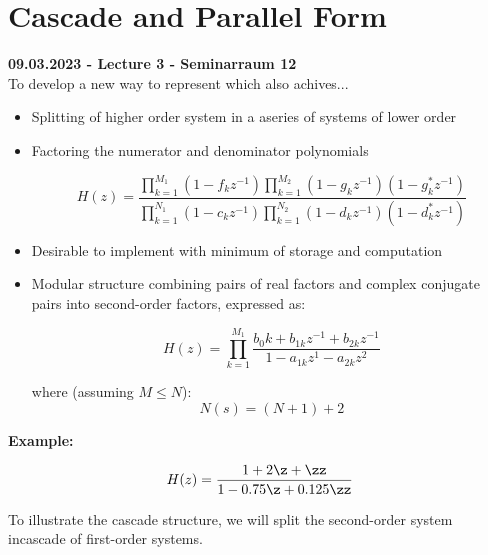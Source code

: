 \section{Cascade and Parallel Form}
\textbf{09.03.2023 - Lecture 3 - Seminarraum 12}\\

To develop a new way to represent which also achives...

\begin{itemize}
	\item Splitting of higher order system in a aseries of systems of lower order
	\item Factoring the numerator and denominator polynomials

	$$
	H(z) =
	\frac{\displaystyle \prod_{k=1}^{M_1}(1-f_kz^{-1}) \prod_{k=1}^{M_2}(1-g_kz^{-1})(1-g^*_kz^{-1})}
		 {\displaystyle \prod_{k=1}^{N_1}(1-c_kz^{-1}) \prod_{k=1}^{N_2}(1-d_kz^{-1})(1-d^*_kz^{-1})}
	$$

	\item Desirable to implement with minimum of storage and computation
	\item Modular structure combining pairs of real factors and complex conjugate pairs into second-order factors, expressed as:

	$$
	H(z) =
	\displaystyle \prod_{k=1}^{M_1}\frac{b_0k+b_{1k}z^{-1}+b_{2k}z^{-1}}{1-a_{1k}z^{1}-a_{2k}z^{2}}
	$$

	where (assuming $M \leq N$):
	$$N(s) = (N+1)+2$$

\end{itemize}

\textbf{Example:}

$$ H(z) = \frac{1+2\z + \zz}{1-0.75\z+0.125\zz}$$

To illustrate the cascade structure, we will split the second-order system incascade of first-order systems.

